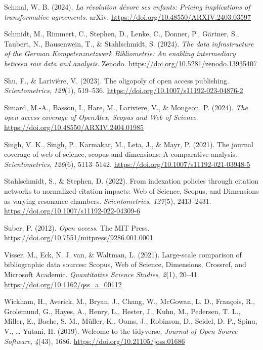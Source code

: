 \documentclass[a4paper,man,floatsintext,longtable,noextraspace,10pt]{apa6}
\newlength{\cslhangindent}
\newenvironment{CSLReferences}[2] %
{\begin{list}{}{%
  \setlength{\itemindent}{0pt}
  \setlength{\leftmargin}{0pt}
  \setlength{\parsep}{0pt}
  \ifodd #1
  \setlength{\leftmargin}{\cslhangindent}
  \setlength{\itemindent}{-1\cslhangindent}
  \fi
  \setlength{\itemsep}{#2\baselineskip}}}
{\end{list}}
\begin{document}
\begin{CSLReferences}{1}{0}
Schmal, W. B. (2024). \emph{La révolution dévore ses enfants: Pricing
implications of transformative agreements}. arXiv.
\url{https://doi.org/10.48550/ARXIV.2403.03597}

Schmidt, M., Rimmert, C., Stephen, D., Lenke, C., Donner, P., Gärtner,
S., Taubert, N., Bausenwein, T., \& Stahlschmidt, S. (2024). \emph{The
data infrastructure of the {German Kompetenznetzwerk Bibliometrie}: An
enabling intermediary between raw data and analysis}. Zenodo.
\url{https://doi.org/10.5281/zenodo.13935407}

Shu, F., \& Larivière, V. (2023). The oligopoly of open access
publishing. \emph{Scientometrics}, \emph{129}(1), 519--536.
\url{https://doi.org/10.1007/s11192-023-04876-2}

Simard, M.-A., Basson, I., Hare, M., Lariviere, V., \& Mongeon, P.
(2024). \emph{The open access coverage of {OpenAlex}, {Scopus} and {Web
of Science}}. \url{https://doi.org/10.48550/ARXIV.2404.01985}

Singh, V. K., Singh, P., Karmakar, M., Leta, J., \& Mayr, P. (2021). The
journal coverage of web of science, scopus and dimensions: A comparative
analysis. \emph{Scientometrics}, \emph{126}(6), 5113--5142.
\url{https://doi.org/10.1007/s11192-021-03948-5}

Stahlschmidt, S., \& Stephen, D. (2022). From indexation policies
through citation networks to normalized citation impacts: {Web of
Science}, {Scopus}, and {Dimensions} as varying resonance chambers.
\emph{Scientometrics}, \emph{127}(5), 2413--2431.
\url{https://doi.org/10.1007/s11192-022-04309-6}

Suber, P. (2012). \emph{Open access}. The MIT Press.
\url{https://doi.org/10.7551/mitpress/9286.001.0001}

Visser, M., Eck, N. J. van, \& Waltman, L. (2021). Large-scale
comparison of bibliographic data sources: {Scopus, Web of Science,
Dimensions, Crossref, and Microsoft Academic}. \emph{Quantitative
Science Studies}, \emph{2}(1), 20--41.
\url{https://doi.org/10.1162/qss_a_00112}

Wickham, H., Averick, M., Bryan, J., Chang, W., McGowan, L. D.,
François, R., Grolemund, G., Hayes, A., Henry, L., Hester, J., Kuhn, M.,
Pedersen, T. L., Miller, E., Bache, S. M., Müller, K., Ooms, J.,
Robinson, D., Seidel, D. P., Spinu, V., \ldots{} Yutani, H. (2019).
Welcome to the {tidyverse}. \emph{Journal of Open Source Software},
\emph{4}(43), 1686. \url{https://doi.org/10.21105/joss.01686}


\end{CSLReferences}
\end{document}
